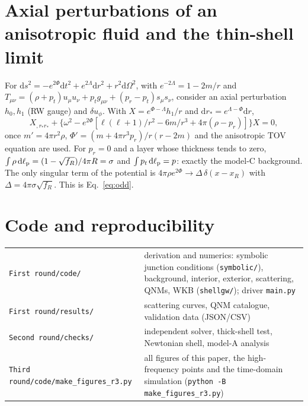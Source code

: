 \documentclass[11pt,a4paper]{article}
\numberwithin{equation}{section}
\newcommand{\sq}{\sqrt{f_R}}
\newcommand{\dd}{\mathrm{d}}
\begin{document}
\section{Axial perturbations of an anisotropic fluid and the thin-shell limit}\label{app:axial}
For $\dd s^2=-e^{2\Phi}\dd t^2+e^{2\Lambda}\dd r^2+r^2\dd\Omega^2$, with $e^{-2\Lambda}=1-2m/r$ and
$T_{\mu\nu}=(\rho+p_t)u_\mu u_\nu+p_tg_{\mu\nu}+(p_r-p_t)s_\mu s_\nu$, consider an axial perturbation $h_0,h_1$ (RW gauge)
and $\delta u_\phi$. With $X=e^{\Phi-\Lambda}h_1/r$ and $\dd r_*=e^{\Lambda-\Phi}\dd r$,
\begin{equation}
X_{,r_*r_*}+\big\{\omega^2-e^{2\Phi}[\ell(\ell+1)/r^2-6m/r^3+4\pi(\rho-p_r)]\big\}X=0,
\end{equation}
once $m'=4\pi r^2\rho$, $\Phi'=(m+4\pi r^3p_r)/r(r-2m)$ and the anisotropic TOV equation are used. For $p_r=0$ and a layer
whose thickness tends to zero, $\int\rho\,\dd\ell_{\rm p}=(1-\sq)/4\pi R=\sigma$ and $\int p_t\,\dd\ell_{\rm p}=p$: exactly
the model-C background. The only singular term of the potential is $4\pi\rho e^{2\Phi}\to\Delta\,\delta(x-x_R)$ with
$\Delta=4\pi\sigma\sq$. This is Eq.~\eqref{eq:odd}.

\section{Code and reproducibility}
\begin{tabular}{p{6.2cm}p{8.6cm}}\toprule
\texttt{First round/code/} & derivation and numerics: symbolic junction conditions (\texttt{symbolic/}), background,
interior, exterior, scattering, QNMs, WKB (\texttt{shellgw/}); driver \texttt{main.py}\\
\texttt{First round/results/} & scattering curves, QNM catalogue, validation data (JSON/CSV)\\
\texttt{Second round/checks/} & independent solver, thick-shell test, Newtonian shell, model-A analysis\\
\texttt{Third round/code/make\_figures\_r3.py} & all figures of this paper, the high-frequency points and the
time-domain simulation (\texttt{python -B make\_figures\_r3.py})\\\bottomrule
\end{tabular}
\end{document}
